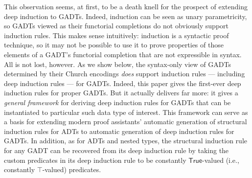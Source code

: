 \documentclass[sigplan,10pt,anonymous,review]{acmart}
\begin{document}
This observation seems, at first, to be a death knell for the prospect
of extending deep induction to GADTs. Indeed, induction can be seen as
unary parametricity, so GADTs viewed as their functorial completions
do not obviously support induction rules.  This makes sense
intuitively: induction is a syntactic proof technique, so it may not
be possible to use it to prove properties of those elements of a
GADT's functorial completion that are not expressible in syntax. All
is not lost, however. As we show below, the syntax-only view of GADTs
determined by their Church encodings {\em does} support induction
rules --- including deep induction rules --- for GADTs. Indeed, this
paper gives the first-ever deep induction rules
for proper GADTs.
But it actually delivers far more: it gives a {\em general framework}
for deriving deep induction rules for GADTs that can be instantiated
to particular such data type of interest. This framework can serve as
a basis for extending modern proof assistants' automatic generation of
structural induction rules for ADTs to automatic generation of deep
induction rules for GADTs. In addition, as for ADTs and nested types,
the structural induction rule for any GADT can be recovered from its
deep induction rule by taking the custom predicates in its deep
induction rule to be constantly $\mathsf{True}$-valued (i.e.,
constantly $\mathsf{\top}$-valued) predicates.
\end{document}
